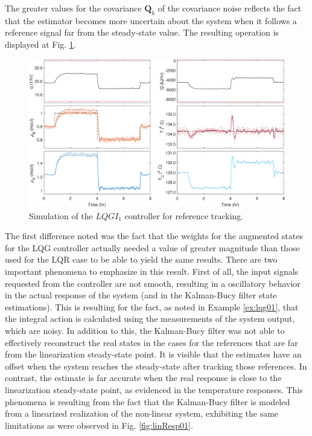 \documentclass[a4paper,11pt]{book}
\numberwithin{figure}{chapter}
\numberwithin{equation}{chapter}
\numberwithin{table}{chapter}
\theoremstyle{definition}
\begin{document}
\noindent The greater values for the covariance $\bm{Q}_k$ of the covariance noise reflects the fact that the estimator becomes more uncertain about the system when it follows a reference signal far from the steady-state value. The resulting operation is displayed at Fig. \ref{fig:lqgi01}. 

\begin{figure}[ht] \centering
	\includegraphics[width=\textwidth]{chapter7/lqgi01}
	\caption{Simulation of the $LQGI_1$ controller for reference tracking.}
	\label{fig:lqgi01}
\end{figure}

The first difference noted was the fact that the weights for the augmented states for the LQG controller actually needed a value of greater magnitude than those used for the LQR case to be able to yield the same results. There are two important phenomena to emphasize in this result. First of all, the input signals requested from the controller are not smooth, resulting in a oscillatory behavior in the actual response of the system (and in the Kalman-Bucy filter state estimations). This is resulting for the fact, as noted in Example \ref{ex:lqg01}, that the integral action is calculated using the measurements of the system output, which are noisy. In addition to this, the Kalman-Bucy filter was not able to effectively reconstruct the real states in the cases for the references that are far from the linearization steady-state point. It is visible that the estimates have an offset when the system reaches the steady-state after tracking those references. In contrast, the estimate is far accurate when the real response is close to the linearization steady-state point, as evidenced in the temperature responses. This phenomena is resulting from the fact that the Kalman-Bucy filter is modeled from a linearized realization of the non-linear system, exhibiting the same limitations as were observed in Fig. \ref{fig:linResp01}.
\end{document}
